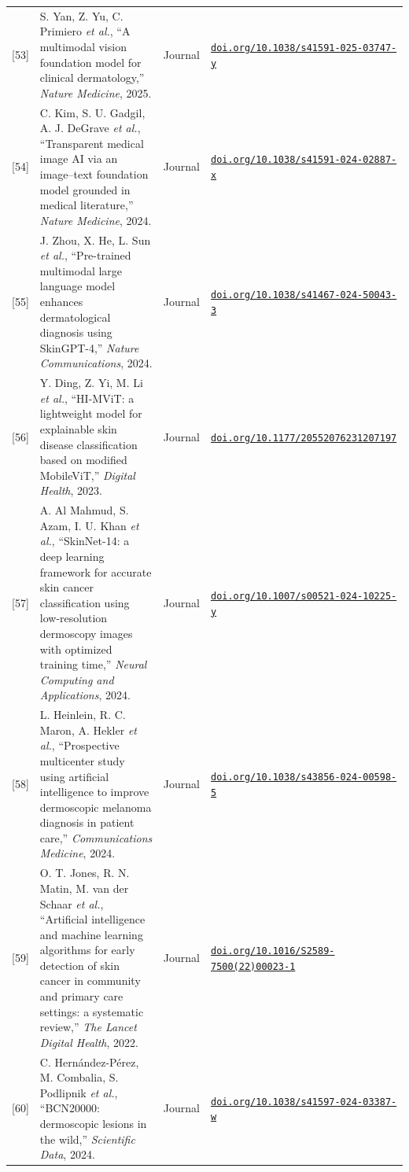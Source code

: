 \documentclass[10pt,a4paper]{article}
\begin{document}
{\begin{longtable}{@{}r L{9.6cm} l L{4.3cm}@{}}
{[53]} & S. Yan, Z. Yu, C. Primiero \emph{et al.}, ``A multimodal vision foundation model for clinical dermatology,'' \emph{Nature Medicine}, 2025. & Journal & \href{https://doi.org/10.1038/s41591-025-03747-y}{\nolinkurl{doi.org/10.1038/s41591-025-03747-y}} \\
{[54]} & C. Kim, S. U. Gadgil, A. J. DeGrave \emph{et al.}, ``Transparent medical image AI via an image--text foundation model grounded in medical literature,'' \emph{Nature Medicine}, 2024. & Journal & \href{https://doi.org/10.1038/s41591-024-02887-x}{\nolinkurl{doi.org/10.1038/s41591-024-02887-x}} \\
{[55]} & J. Zhou, X. He, L. Sun \emph{et al.}, ``Pre-trained multimodal large language model enhances dermatological diagnosis using SkinGPT-4,'' \emph{Nature Communications}, 2024. & Journal & \href{https://doi.org/10.1038/s41467-024-50043-3}{\nolinkurl{doi.org/10.1038/s41467-024-50043-3}} \\
{[56]} & Y. Ding, Z. Yi, M. Li \emph{et al.}, ``HI-MViT: a lightweight model for explainable skin disease classification based on modified MobileViT,'' \emph{Digital Health}, 2023. & Journal & \href{https://doi.org/10.1177/20552076231207197}{\nolinkurl{doi.org/10.1177/20552076231207197}} \\
{[57]} & A. Al Mahmud, S. Azam, I. U. Khan \emph{et al.}, ``SkinNet-14: a deep learning framework for accurate skin cancer classification using low-resolution dermoscopy images with optimized training time,'' \emph{Neural Computing and Applications}, 2024. & Journal & \href{https://doi.org/10.1007/s00521-024-10225-y}{\nolinkurl{doi.org/10.1007/s00521-024-10225-y}} \\
{[58]} & L. Heinlein, R. C. Maron, A. Hekler \emph{et al.}, ``Prospective multicenter study using artificial intelligence to improve dermoscopic melanoma diagnosis in patient care,'' \emph{Communications Medicine}, 2024. & Journal & \href{https://doi.org/10.1038/s43856-024-00598-5}{\nolinkurl{doi.org/10.1038/s43856-024-00598-5}} \\
{[59]} & O. T. Jones, R. N. Matin, M. van der Schaar \emph{et al.}, ``Artificial intelligence and machine learning algorithms for early detection of skin cancer in community and primary care settings: a systematic review,'' \emph{The Lancet Digital Health}, 2022. & Journal & \href{https://doi.org/10.1016/S2589-7500(22)00023-1}{\nolinkurl{doi.org/10.1016/S2589-7500(22)00023-1}} \\
{[60]} & C. Hern{\'a}ndez-P{\'e}rez, M. Combalia, S. Podlipnik \emph{et al.}, ``BCN20000: dermoscopic lesions in the wild,'' \emph{Scientific Data}, 2024. & Journal & \href{https://doi.org/10.1038/s41597-024-03387-w}{\nolinkurl{doi.org/10.1038/s41597-024-03387-w}} \\

\end{longtable}}
\end{document}
